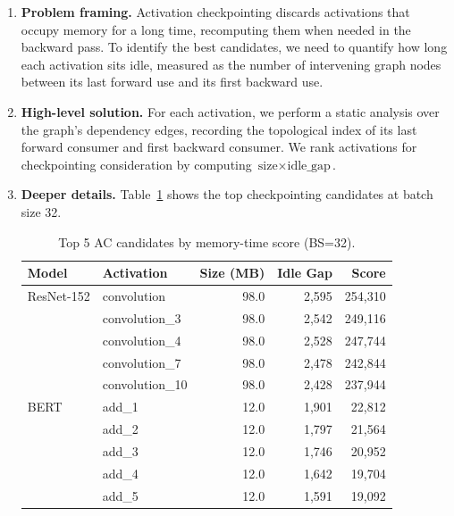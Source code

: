 \documentclass[11pt]{article}
\begin{document}
\begin{enumerate}[label=\alph*),nosep,leftmargin=*]
\item \textbf{Problem framing.}
Activation checkpointing discards activations that occupy memory for a long time, recomputing them when needed in the backward pass. To identify the best candidates, we need to quantify how long each activation sits idle, measured as the number of intervening graph nodes between its last forward use and its first backward use.

\item \textbf{High-level solution.}
For each activation, we perform a static analysis over the graph's dependency edges, recording the topological index of its last forward consumer and first backward consumer. We rank activations for checkpointing consideration by computing $\text{size} \times \text{idle\_gap}$.

\item \textbf{Deeper details.}
Table~\ref{tab:ac_candidates} shows the top checkpointing candidates at batch size 32.

\begin{table}[h]
\centering
\caption{Top 5 AC candidates by memory-time score (BS=32).}
\label{tab:ac_candidates}
\begin{tabular}{llrrr}
\toprule
\textbf{Model} & \textbf{Activation} & \textbf{Size (MB)} & \textbf{Idle Gap} & \textbf{Score} \\
\midrule
ResNet-152 & convolution   & 98.0 & 2{,}595 & 254{,}310 \\
           & convolution\_3 & 98.0 & 2{,}542 & 249{,}116 \\
           & convolution\_4 & 98.0 & 2{,}528 & 247{,}744 \\
           & convolution\_7 & 98.0 & 2{,}478 & 242{,}844 \\
           & convolution\_10 & 98.0 & 2{,}428 & 237{,}944 \\
\midrule
BERT       & add\_1  & 12.0 & 1{,}901 & 22{,}812 \\
           & add\_2  & 12.0 & 1{,}797 & 21{,}564 \\
           & add\_3  & 12.0 & 1{,}746 & 20{,}952 \\
           & add\_4  & 12.0 & 1{,}642 & 19{,}704 \\
           & add\_5  & 12.0 & 1{,}591 & 19{,}092 \\
\bottomrule
\end{tabular}
\end{table}


\end{enumerate}
\end{document}
